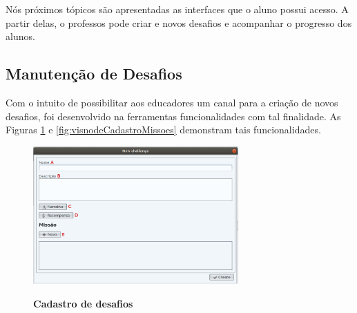 \documentclass[
	12pt,				%
	oneside,			%
	a4paper,			%
	english,			%
	french,				%
	spanish,			%
	brazil,				%
	]{abntex2}
\begin{document}
Nós próximos tópicos são apresentadas as interfaces que o aluno possui acesso. A partir delas, o professos pode criar e novos desafios e acompanhar o progresso dos alunos.

\subsection{Manutenção de Desafios}

Com o intuito de possibilitar aos educadores um canal para a criação de novos desafios, foi desenvolvido na ferramentas funcionalidades com tal finalidade. As Figuras \ref{fig:visnodeCadastroDesafio} e \ref{fig:visnodeCadastroMissoes} demonstram tais funcionalidades. 

\begin{figure}[H]
\centering
\caption{\textbf{Cadastro de desafios}}
\includegraphics[width=0.7\textwidth]{imagens/visnode_cadastro_desafio.png}
\sourceAuthor
\label{fig:visnodeCadastroDesafio}
\end{figure}
\end{document}
